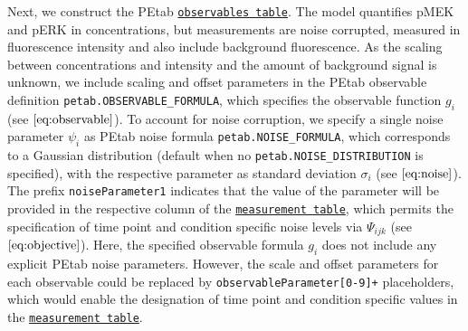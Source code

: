 \documentclass[11pt]{article}
\begin{document}
Next, we construct the PEtab
\href{https://petab.readthedocs.io/en/latest/documentation_data_format.html\#observables-table}{\texttt{observables\ table}}.
The model quantifies pMEK and pERK in concentrations, but measurements
are noise corrupted, measured in fluorescence intensity and also include
background fluorescence. As the scaling between concentrations and
intensity and the amount of background signal is unknown, we include
scaling and offset parameters in the PEtab observable definition
\texttt{petab.OBSERVABLE\_FORMULA}, which specifies the observable
function \(g_i\) (see \(\eqref{eq:observable}\)). To account for noise
corruption, we specify a single noise parameter \(\psi_i\) as PEtab
noise formula \texttt{petab.NOISE\_FORMULA}, which corresponds to a
Gaussian distribution (default when no
\texttt{petab.NOISE\_DISTRIBUTION} is specified), with the respective
parameter as standard deviation \(\sigma_i\) (see \(\eqref{eq:noise}\)).
The prefix \texttt{noiseParameter1} indicates that the value of the
parameter will be provided in the respective column of the
\href{https://petab.readthedocs.io/en/latest/documentation_data_format.html\#measurement-table}{\texttt{measurement\ table}},
which permits the specification of time point and condition specific
noise levels via \(\Psi_{ijk}\) (see \(\eqref{eq:objective}\)). Here,
the specified observable formula \(g_i\) does not include any explicit
PEtab noise parameters. However, the scale and offset parameters for
each observable could be replaced by
\texttt{observableParameter{[}0-9{]}+} placeholders, which would enable
the designation of time point and condition specific values in the
\href{https://petab.readthedocs.io/en/latest/documentation_data_format.html\#measurement-table}{\texttt{measurement\ table}}.
\end{document}
